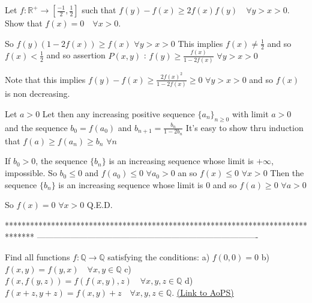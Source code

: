 \begin{solution}
	\begin{tcolorbox}Let $f: \mathbb {R}^{+} \to  \left[\frac{-1}{ 2}, \frac{1}{2}\right ]$ such that $f (y) - f (x)\geq  2f (x)f (y) \quad \forall y> x> 0$. Show that $f (x) = 0 \quad \forall x> 0$.\end{tcolorbox}
So $f(y)(1-2f(x))\ge f(x)$ $\forall y>x>0$
This implies $f(x)\ne \frac 12$ and so $f(x)<\frac 12$ and so assertion $P(x,y)$ : $f(y)\ge \frac {f(x)}{1-2f(x)}$ $\forall y>x>0$

Note that this implies $f(y)-f(x)\ge \frac {2f(x)^2}{1-2f(x)}\ge 0$ $\forall y>x>0$ and so $f(x)$ is non decreasing.

Let $a>0$
Let then any increasing positive sequence $\{a_n\}_{n\ge 0}$ with limit $a>0$ and the sequence $b_0=f(a_0)$ and $b_{n+1}=\frac{b_n}{1-2b_n}$
It's easy to show thru induction that $f(a)\ge f(a_n)\ge b_n$ $\forall n$

If $b_0>0$, the sequence $\{b_n\}$ is an increasing sequence whose limit is $+\infty$, impossible. 
So $b_0\le 0$ and $f(a_0)\le 0$ $\forall a_0>0$ an so $f(x)\le 0$ $\forall x>0$
Then the sequence $\{b_n\}$ is an increasing sequence whose limit is $0$ and so $f(a)\ge 0$ $\forall a>0$

So $f(x)=0$ $\forall x>0$
Q.E.D.
\end{solution}
*******************************************************************************
-------------------------------------------------------------------------------

\begin{problem}
	Find all functions $f: \mathbb Q\to\mathbb  Q$ satisfying the conditions:
a) $f (0, 0) = 0$
b) $f (x, y) = f (y, x) \quad \forall x, y \in\mathbb Q$
c) $f (x, f (y, z)) = f (f (x, y), z)\quad \forall x, y, z \in\mathbb Q$ 
d) $f (x + z, y + z) = f (x, y) + z\quad \forall x, y, z \in\mathbb Q$.
	\flushright \href{https://artofproblemsolving.com/community/c6h566433}{(Link to AoPS)}
\end{problem}



